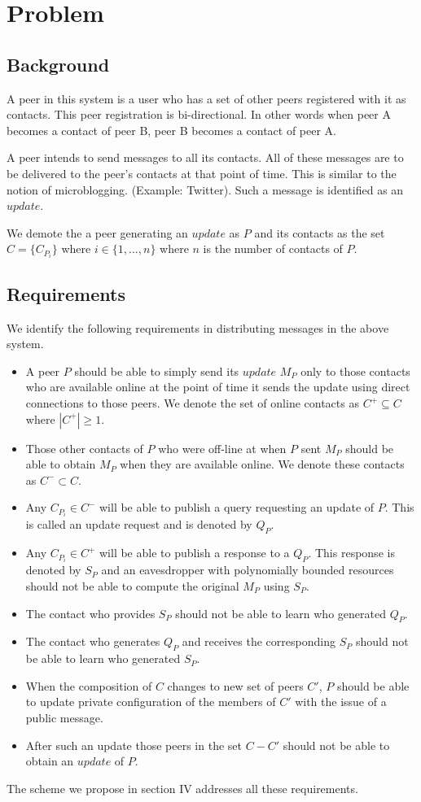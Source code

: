 \section{Problem}


\subsection{Background}
A peer in this system is a user who has a set of other peers registered with it as contacts. This peer registration is bi-directional. In other words when peer A becomes a contact of peer B, peer B becomes a contact of peer A. 

A peer intends to send messages to all its contacts. All of these messages are to be delivered to the peer's contacts at that point of time. This is similar to the notion of microblogging. (Example: Twitter\cite{twitter}). Such a message is identified as an $update$.

We demote the a peer generating an $update$ as $P$ and its contacts as the set $C = \{C_{P_i}\}$ where $i \in \{1 , ..., n\}$ where $n$ is the number of contacts of $P$.

\subsection{Requirements}
We identify the following requirements in distributing messages in the above system.
\begin{itemize}
	\item A peer $P$ should be able to simply send its $update$ $M_P$ only to those contacts who are available online at the point of time it sends the update using direct connections to those peers. We denote the set of online contacts as  ${C^+} \subseteq C$ where $|{C^+}| \geq 1$.
	\item Those other contacts of $P$ who were off-line at when $P$ sent $M_P$ should be able to obtain $M_P$ when they are available online. We denote these contacts as ${C^-} \subset C$.
	\item Any $C_{P_i} \in C^-$ will be able to publish a query requesting an update of $P$. This is called an update request and is denoted by $Q_P$.
	\item Any  $C_{P_i} \in C^+$ will be able to publish a response to a $Q_P$. This response is denoted by $S_P$ and an eavesdropper with polynomially bounded resources should not be able to compute the original $M_P$ using $S_P$.
	\item The contact who provides $S_P$ should not be able to learn who generated $Q_P$.
	\item The contact who generates $Q_P$ and receives the corresponding $S_P$ should not be able to learn who generated $S_P$.
	\item When the composition of $C$ changes to new set of peers $C'$, $P$ should be able to update private configuration of the members of $C'$ with the issue of a public message.
	\item After such an update those peers in the set $C - C'$ should not be able to obtain an $update$ of $P$.
\end{itemize}
The scheme we propose in section IV addresses all these requirements.

